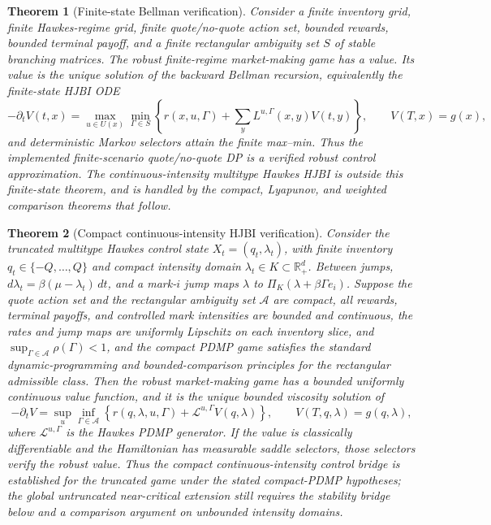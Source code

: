 \documentclass[11pt]{article}
\newtheorem{theorem}{Theorem}
\newcommand{\R}{\mathbb{R}}
\begin{document}
\begin{theorem}[Finite-state Bellman verification]
Consider a finite inventory grid, finite Hawkes-regime grid, finite
quote/no-quote action set, bounded rewards, bounded terminal payoff, and a
finite rectangular ambiguity set $S$ of stable branching matrices. The robust
finite-regime market-making game has a value. Its value is the unique solution
of the backward Bellman recursion, equivalently the finite-state HJBI ODE
\[
-\partial_t V(t,x)=
\max_{u\in U(x)}\min_{\Gamma\in S}
\left\{r(x,u,\Gamma)+\sum_y L^{u,\Gamma}(x,y)V(t,y)\right\},
\qquad V(T,x)=g(x),
\]
and deterministic Markov selectors attain the finite max--min. Thus the
implemented finite-scenario quote/no-quote DP is a verified robust control
approximation. The continuous-intensity multitype Hawkes HJBI is outside this
finite-state theorem, and is handled by the compact, Lyapunov, and weighted
comparison theorems that follow.
\end{theorem}

\begin{theorem}[Compact continuous-intensity HJBI verification]
Consider the truncated multitype Hawkes control state
$X_t=(q_t,\lambda_t)$, with finite inventory
$q_t\in\{-Q,\ldots,Q\}$ and compact intensity domain
$\lambda_t\in K\subset\R_+^d$. Between jumps,
$d\lambda_t=\beta(\mu-\lambda_t)\,dt$, and a mark-$i$ jump maps
$\lambda$ to $\Pi_K(\lambda+\beta\Gamma e_i)$. Suppose the quote action set
and the rectangular ambiguity set $\mathcal A$ are compact, all rewards,
terminal payoffs, and controlled mark intensities are bounded and continuous,
the rates and jump maps are uniformly Lipschitz on each inventory slice, and
$\sup_{\Gamma\in\mathcal A}\rho(\Gamma)<1$, and the compact PDMP game satisfies
the standard dynamic-programming and bounded-comparison principles for the
rectangular admissible class. Then the robust market-making game has a bounded
uniformly continuous value function, and it is the unique bounded viscosity
solution of
\[
-\partial_t V=
\sup_{u}\inf_{\Gamma\in\mathcal A}
\left\{
r(q,\lambda,u,\Gamma)+\mathcal L^{u,\Gamma}V(q,\lambda)
\right\},\qquad
V(T,q,\lambda)=g(q,\lambda),
\]
where $\mathcal L^{u,\Gamma}$ is the Hawkes PDMP generator. If the value is
classically differentiable and the Hamiltonian has measurable saddle
selectors, those selectors verify the robust value. Thus the compact
continuous-intensity control bridge is established for the truncated game under
the stated compact-PDMP hypotheses; the global untruncated near-critical
extension still requires the stability bridge below and a comparison argument
on unbounded intensity domains.
\end{theorem}
\end{document}
